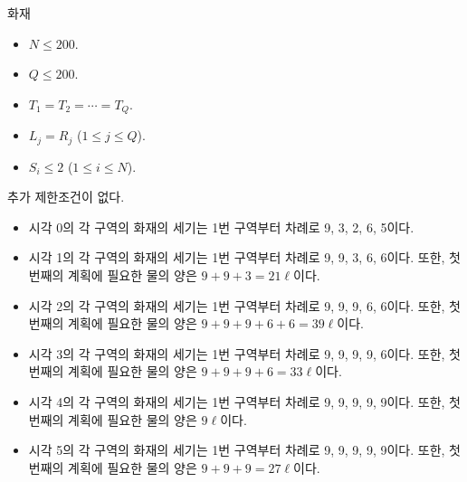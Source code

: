 \begin{problem}{화재}
\begin{itemize}
	\end{itemize}
	
	
	\begin{itemize}
		\item $N \le 200$.
		\item $Q \le 200$.
	\end{itemize}

	\begin{itemize}
		\item $T_1 = T_2 = \cdots = T_Q$.
	\end{itemize}

	\begin{itemize}
		\item $L_j = R_j$ ($1 \le j \le Q$).
			\end{itemize}


	\begin{itemize}
		\item $S_i \le 2$ ($1 \le i \le N$).
	\end{itemize}
	
	
	추가 제한조건이 없다.
	
	\Examples
		
	\begin{example}
	\end{example}

	\begin{itemize}
		\item 시각 0의 각 구역의 화재의 세기는 1번 구역부터 차례로 9, 3, 2, 6, 5이다.
		\item 시각 1의 각 구역의 화재의 세기는 1번 구역부터 차례로 9, 9, 3, 6, 6이다. 또한, 첫 번째의 계획에 필요한 물의 양은 $9+9+3 = 21\ell$이다.
		\item 시각 2의 각 구역의 화재의 세기는 1번 구역부터 차례로 9, 9, 9, 6, 6이다. 또한, 첫 번째의 계획에 필요한 물의 양은 $9+9+9+6+6 = 39\ell$이다.
		\item 시각 3의 각 구역의 화재의 세기는 1번 구역부터 차례로 9, 9, 9, 9, 6이다. 또한, 첫 번째의 계획에 필요한 물의 양은 $9+9+9+6 = 33\ell$이다.
		\item 시각 4의 각 구역의 화재의 세기는 1번 구역부터 차례로 9, 9, 9, 9, 9이다. 또한, 첫 번째의 계획에 필요한 물의 양은 $9\ell$이다.
		\item 시각 5의 각 구역의 화재의 세기는 1번 구역부터 차례로 9, 9, 9, 9, 9이다. 또한, 첫 번째의 계획에 필요한 물의 양은 $9+9+9=27\ell$이다.
	\end{itemize}


\end{problem}
